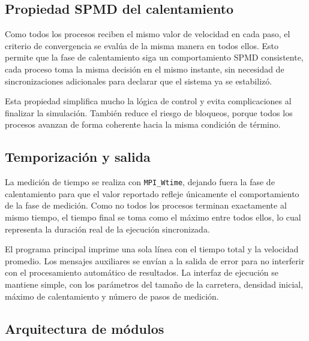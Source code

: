 \subsection{Propiedad SPMD del calentamiento}

Como todos los procesos reciben el mismo valor de velocidad en cada paso, el criterio de convergencia se evalúa de la misma manera en todos ellos. Esto permite que la fase de calentamiento siga un comportamiento SPMD consistente, cada proceso toma la misma decisión en el mismo instante, sin necesidad de sincronizaciones adicionales para declarar que el sistema ya se estabilizó.

Esta propiedad simplifica mucho la lógica de control y evita complicaciones al finalizar la simulación. También reduce el riesgo de bloqueos, porque todos los procesos avanzan de forma coherente hacia la misma condición de término.

\subsection{Temporización y salida}

La medición de tiempo se realiza con \texttt{MPI\_Wtime}, dejando fuera la fase de calentamiento para que el valor reportado refleje únicamente el comportamiento de la fase de medición. Como no todos los procesos terminan exactamente al mismo tiempo, el tiempo final se toma como el máximo entre todos ellos, lo cual representa la duración real de la ejecución sincronizada.

El programa principal imprime una sola línea con el tiempo total y la velocidad promedio. Los mensajes auxiliares se envían a la salida de error para no interferir con el procesamiento automático de resultados. La interfaz de ejecución se mantiene simple, con los parámetros del tamaño de la carretera, densidad inicial, máximo de calentamiento y número de pasos de medición.

\subsection{Arquitectura de módulos}

